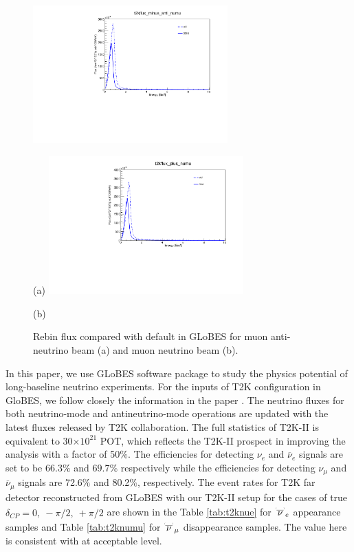 \documentclass[a4 paper,12pt]{report}%
\newcommand\brabar{\raisebox{-4.0pt}{\scalebox{.2}{
\textbf{(}}}\raisebox{-4.0pt}{{\_}}\raisebox{-4.0pt}{\scalebox{.2}{\textbf{)
}}}}
\begin{document}
  \begin{figure}
 	\centering
 	\includegraphics[width=7.5cm]{t2kflux_minus_anti_numu.pdf} 
 	\caption*{}{(a)}
 \endminipage
 \hfill
\quad
 \centering
 \includegraphics[width=7.5cm]{t2kflux_plus_numu.pdf}
 \caption*{}{(b)}
 \endminipage
  \caption{{\label{rebinflux}} Rebin flux compared with default in GLoBES for muon anti-neutrino beam (a) and muon neutrino beam (b).}
 \hfill
 \end{figure}


In this paper, we use GLoBES software package \cite{Huber:2002mx}  to study the physics potential of long-baseline neutrino experiments. For the inputs of T2K configuration in GloBES, we follow closely the information in the paper \cite{Abe:2016tez}. The neutrino fluxes for both neutrino-mode and antineutrino-mode operations are updated with the latest fluxes released by T2K collaboration. The full statistics of T2K-II is equivalent to 30$\times 10^{21}$ POT, which reflects the T2K-II prospect in improving the analysis with a factor of 50$\%$. The efficiencies for detecting $\nu_{e}$ and $\overline{\nu}_e$ signals are set to be $66.3\%$ and $69.7\%$ respectively while the efficiencies for detecting $\nu_{\mu}$ and $\overline{\nu}_{\mu}$ signals are 72.6$\%$ and 80.2$\%$, respectively. The event rates for T2K far detector reconstructed from GLoBES with our T2K-II setup for the cases of true $\delta_{CP} = 0,\ -\pi/2,\ +\pi/2$ are shown in the Table \ref{tab:t2knue} for $\overset{\brabar}{\nu}_{e}$ appearance samples and Table \ref{tab:t2knumu} for $\overset{\brabar}{\nu}_{\mu}$ disappearance samples. The  value here is consistent with  \cite{Abe:2016tez} at acceptable level. %
\end{document}
